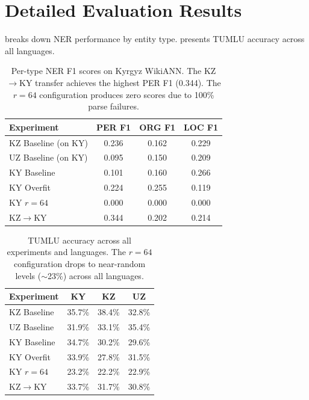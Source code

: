 \documentclass[11pt]{article}
\begin{document}
\section{Detailed Evaluation Results}
\label{app:ner}

 breaks down NER performance by entity type.  presents TUMLU accuracy across all languages.

\begin{table}[H]
\centering
\small
\begin{tabular}{lccc}
\toprule
\textbf{Experiment} & \textbf{PER F1} & \textbf{ORG F1} & \textbf{LOC F1} \\
\midrule
KZ Baseline (on KY) & 0.236 & 0.162 & 0.229 \\
UZ Baseline (on KY) & 0.095 & 0.150 & 0.209 \\
KY Baseline & 0.101 & 0.160 & 0.266 \\
KY Overfit & 0.224 & 0.255 & 0.119 \\
KY $r{=}64$ & 0.000 & 0.000 & 0.000 \\
KZ$\rightarrow$KY & 0.344 & 0.202 & 0.214 \\
\bottomrule
\end{tabular}
\caption{Per-type NER F1 scores on Kyrgyz WikiANN. The KZ$\rightarrow$KY transfer achieves the highest PER F1 (0.344). The $r{=}64$ configuration produces zero scores due to 100\% parse failures.}
\label{tab:ner_pertype}
\end{table}

\begin{table}[H]
\centering
\small
\begin{tabular}{lccc}
\toprule
\textbf{Experiment} & \textbf{KY} & \textbf{KZ} & \textbf{UZ} \\
\midrule
KZ Baseline & 35.7\% & 38.4\% & 32.8\% \\
UZ Baseline & 31.9\% & 33.1\% & 35.4\% \\
KY Baseline & 34.7\% & 30.2\% & 29.6\% \\
KY Overfit & 33.9\% & 27.8\% & 31.5\% \\
KY $r{=}64$ & 23.2\% & 22.2\% & 22.9\% \\
KZ$\rightarrow$KY & 33.7\% & 31.7\% & 30.8\% \\
\bottomrule
\end{tabular}
\caption{TUMLU accuracy across all experiments and languages. The $r{=}64$ configuration drops to near-random levels ($\sim$23\%) across all languages.}
\label{tab:tumlu_full}
\end{table}
\end{document}
